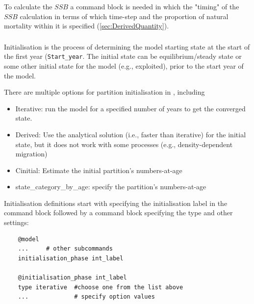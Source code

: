 To calculate the $SSB$ a  command block is needed in which the "timing" of the $SSB$ calculation in terms of which time-step and the proportion of natural mortality within it is specified (\ref{sec:DerivedQuantity}).

\subsubsection{}\label{sec:Initialisation}

Initialisation is the process of determining the model starting state at the start of the first year (\texttt{Start\_year}. The initial state can be equilibrium/steady state or some other initial state for the model (e.g., exploited), prior to the start year of the model.

There are multiple options for partition initialisation in \CNAME, including

\begin{itemize}
	\item Iterative: run the model for a specified number of years to get the converged state.
	\item Derived: Use the analytical solution (i.e., faster than iterative) for the initial state, but it does not work with some processes (e.g., density-dependent migration)
	\ifAgeBased
	\item Cinitial: Estimate the initial partition's numbers-at-age
	\item state\_category\_by\_age: specify the partition's numbers-at-age
	\else
    \fi
\end{itemize}

Initialisation definitions start with specifying the initialisation label in the  command block followed by a  command block specifying the type and other settings:

{\small{\begin{verbatim}
	@model
	...     # other subcommands
	initialisation_phase int_label
	
	@initialisation_phase int_label
	type iterative  #choose one from the list above
	...             # specify option values
\end{verbatim}}}

